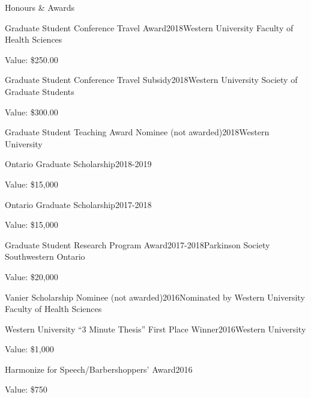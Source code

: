 \documentclass{resume} %
\begin{document}
\begin{rSection}{Honours \& Awards}


\begin{rSubsection}{Graduate Student Conference Travel Award}{2018}{Western University Faculty of Health Sciences}{}
\item Value: \$250.00
\end{rSubsection}

\begin{rSubsection}{Graduate Student Conference Travel Subsidy}{2018}{Western University Society of Graduate Students}{}
\item Value: \$300.00
\end{rSubsection}

\begin{rSubsection}{Graduate Student Teaching Award Nominee (not awarded)}{2018}{Western University}{}
\end{rSubsection}

\begin{rSubsection}{Ontario Graduate Scholarship}{2018-2019}{}{}
\item Value: \$15,000
\end{rSubsection}

\begin{rSubsection}{Ontario Graduate Scholarship}{2017-2018}{}{}
\item Value: \$15,000
\end{rSubsection}

\begin{rSubsection}{Graduate Student Research Program Award}{2017-2018}{Parkinson Society Southwestern Ontario}{}
\item Value: \$20,000
\end{rSubsection}

\begin{rSubsection}{Vanier Scholarship Nominee (not awarded)}{2016}{Nominated by Western University Faculty of Health Sciences}{}
\end{rSubsection}

\begin{rSubsection}{Western University ``3 Minute Thesis'' First Place Winner}{2016}{Western University}{}
\item  Value: \$1,000
\end{rSubsection}

\begin{rSubsection}{Harmonize for Speech/Barbershoppers' Award}{2016}{}{ }
\item Value: \$750
\end{rSubsection}


\end{rSection}
\end{document}
